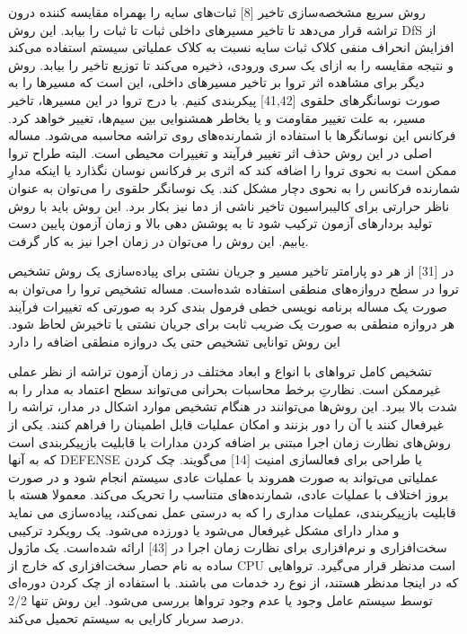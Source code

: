 روش سریع مشخصه‌سازی تاخیر [8] ثبات‌های سایه را بهمراه مقایسه کننده درون تراشه قرار می‌دهد تا تاخیر مسیرهای داخلی ثبات تا ثبات را بیابد. این روش DfS از افزایش انحراف منفی کلاک ثبات سایه نسبت به کلاک عملیاتی سیستم استفاده می‌کند و نتیجه مقایسه را به ازای یک سری ورودی، ذخیره می‌کند تا توزیع تاخیر را بیابد. 
روش دیگر برای مشاهده اثر تروا بر تاخیر مسیرهای داخلی، این است که مسیرها را به صورت نوسانگرهای حلقوی [41,42] پیکربندی کنیم. با درج تروا در این مسیرها، تاخیر مسیر، به علت تغییر مقاومت و یا بخاطر همشنوایی بین سیم‌ها، تغییر خواهد کرد. فرکانس این نوسانگرها با استفاده از شمارنده‌های روی تراشه محاسبه می‌شود. مساله اصلی در این روش حذف اثر تغییر فرآیند و تغییرات محیطی است. البته طراح تروا ممکن است به نحوی تروا را اضافه کند که اثری بر فرکانس نوسان نگذارد یا اینکه مدارِ شمارنده فرکانس را به نحوی دچار مشکل کند. یک نوسانگر حلقوی را می‌توان به عنوان ناظر حرارتی برای کالیبراسیون تاخیر ناشی از دما نیز بکار برد. این روش باید با روش تولید بردارهای آزمون  ترکیب شود تا به پوشش دهی بالا و زمان آزمون پایین دست یابیم. این روش را می‌توان در زمان اجرا نیز به کار گرفت.

در [31] از هر دو پارامتر تاخیر مسیر و جریان نشتی برای پیاده‌سازی یک روش تشخیص تروا در سطح دروازه‌های منطقی استفاده شده‌است. مساله تشخیص تروا را می‌توان به صورت یک مساله برنامه نویسی خطی فرمول بندی کرد به صورتی که تغییرات فرآیند هر دروازه منطقی به صورت یک ضریب ثابت برای جریان نشتی یا تاخیرش لحاظ شود. این روش توانایی تشخیص حتی یک دروازه منطقی اضافه را دارد


تشخیص کامل تروا‌های با انواع و ابعاد مختلف در زمان آزمون تراشه از نظر عملی غیرممکن است. نظارتِ برخط محاسبات بحرانی می‌تواند سطح اعتماد به مدار را به شدت بالا ببرد. این روش‌ها می‌توانند در هنگام تشخیص موارد اشکال در مدار، تراشه را غیرفعال کنند یا آن را دور بزنند و امکان عملیات قابل اطمینان را فراهم کنند. یکی از روش‌های نظارت زمان اجرا  مبتنی بر اضافه کردن مدارات با قابلیت بازپیکربندی است که به آنها DEFENSE  یا طراحی برای فعالسازی امنیت [14] می‌گویند. چک کردن عملیاتی می‌تواند به صورت همروند با عملیات عادی سیستم انجام شود و در صورت بروز اختلاف با عملیات عادی، شمارنده‌های متناسب را تحریک می‌کند. معمولا هسته با قابلیت بازپیکربندی، عملیات مداری را که به درستی عمل نمی‌کند، پیاده‌سازی می نماید و مدار دارای مشکل غیرفعال می‌شود یا دورزده می‌شود.
یک رویکرد ترکیبی سخت‌افزاری و نرم‌افزاری برای نظارت زمان اجرا در [43] ارائه شده‌است. یک ماژول ساده به نام حصار سخت‌افزاری که خارج از CPU است مدنظر قرار می‌گیرد. تروا‌هایی که در اینجا مدنظر هستند، از نوع رد خدمات می باشند. با استفاده از چک کردن دوره‌ای توسط سیستم عامل وجود یا عدم وجود تروا‌ها بررسی می‌شود. این روش تنها 2/2 درصد سربار کارایی به سیستم تحمیل می‌کند.

